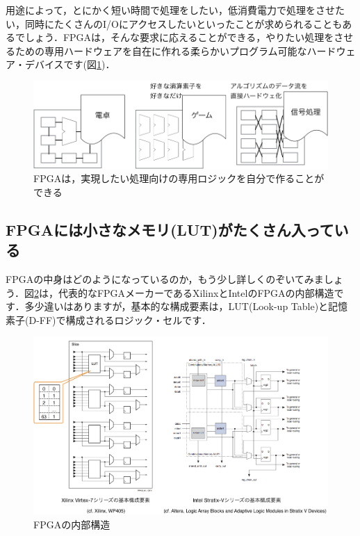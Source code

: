 \documentclass[a4paper,dvipdfmx]{jsarticle}
\begin{document}
用途によって，とにかく短い時間で処理をしたい，低消費電力で処理をさせたい，同時にたくさんのI/Oにアクセスしたいといったことが求められることもあるでしょう．FPGAは，そんな要求に応えることができる，やりたい処理をさせるための専用ハードウェアを自在に作れる柔らかいプログラム可能なハードウェア・デバイスです(図\ref{fig:fpga_processing_image})．

 \begin{figure}[H]
  \begin{center}
   \includegraphics[width=.95\textwidth]{chapter01_figures/fpga_processing_image.png}
  \end{center}
  \caption{FPGAは，実現したい処理向けの専用ロジックを自分で作ることができる \label{fig:fpga_processing_image}}
 \end{figure}

\subsection{FPGAには小さなメモリ(LUT)がたくさん入っている}
FPGAの中身はどのようになっているのか，もう少し詳しくのぞいてみましょう．図\ref{fig:inside_fpga_example}は，代表的なFPGAメーカーであるXilinxとIntelのFPGAの内部構造です．多少違いはありますが，基本的な構成要素は，LUT(Look-up Table)と記憶素子(D-FF)で構成されるロジック・セルです．

 \begin{figure}[H]
  \begin{center}
   \includegraphics[width=.95\textwidth]{chapter01_figures/inside_fpga_example.png}
  \end{center}
  \caption{FPGAの内部構造 \label{fig:inside_fpga_example}}
 \end{figure}
\end{document}
